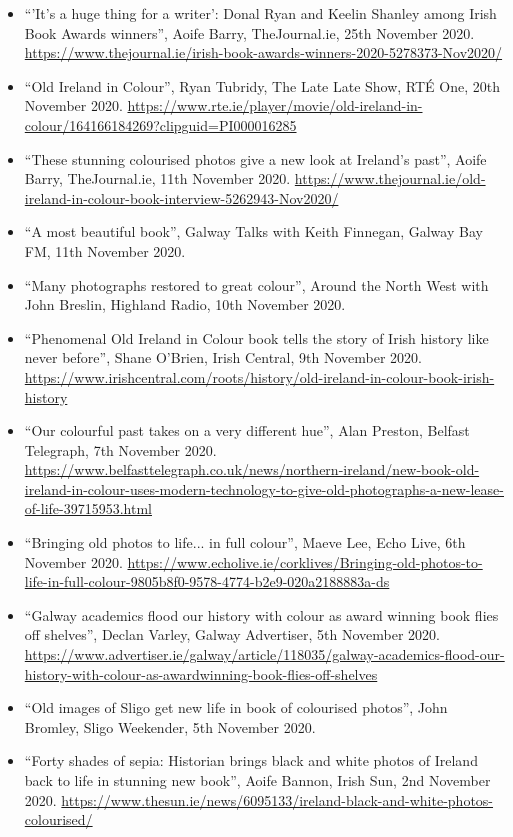 \documentclass[10pt,a4paper]{res} %
\begin{document}
\begin{resume}
{\begin{itemize}
\item ``'It's a huge thing for a writer': Donal Ryan and Keelin Shanley among Irish Book Awards winners'', Aoife Barry, TheJournal.ie, 25th November 2020. \url{https://www.thejournal.ie/irish-book-awards-winners-2020-5278373-Nov2020/}
\item ``Old Ireland in Colour'', Ryan Tubridy, The Late Late Show, RT\'{E} One, 20th November 2020. \url{https://www.rte.ie/player/movie/old-ireland-in-colour/164166184269?clipguid=PI000016285}
\item ``These stunning colourised photos give a new look at Ireland's past'', Aoife Barry, TheJournal.ie, 11th November 2020. \url{https://www.thejournal.ie/old-ireland-in-colour-book-interview-5262943-Nov2020/}
\item ``A most beautiful book'', Galway Talks with Keith Finnegan, Galway Bay FM, 11th November 2020.
\item ``Many photographs restored to great colour'', Around the North West with John Breslin, Highland Radio, 10th November 2020.
\item ``Phenomenal Old Ireland in Colour book tells the story of Irish history like never before'', Shane O'Brien, Irish Central, 9th November 2020. \url{https://www.irishcentral.com/roots/history/old-ireland-in-colour-book-irish-history}
\item ``Our colourful past takes on a very different hue'', Alan Preston, Belfast Telegraph, 7th November 2020. \url{https://www.belfasttelegraph.co.uk/news/northern-ireland/new-book-old-ireland-in-colour-uses-modern-technology-to-give-old-photographs-a-new-lease-of-life-39715953.html}
\item ``Bringing old photos to life... in full colour'', Maeve Lee, Echo Live, 6th November 2020. \url{https://www.echolive.ie/corklives/Bringing-old-photos-to-life-in-full-colour-9805b8f0-9578-4774-b2e9-020a2188883a-ds}
\item ``Galway academics flood our history with colour as award winning book flies off shelves'', Declan Varley, Galway Advertiser, 5th November 2020. \url{https://www.advertiser.ie/galway/article/118035/galway-academics-flood-our-history-with-colour-as-awardwinning-book-flies-off-shelves}
\item ``Old images of Sligo get new life in book of colourised photos'', John Bromley, Sligo Weekender, 5th November 2020.
\item ``Forty shades of sepia: Historian brings black and white photos of Ireland back to life in stunning new book'', Aoife Bannon, Irish Sun, 2nd November 2020. \url{https://www.thesun.ie/news/6095133/ireland-black-and-white-photos-colourised/}

\end{itemize}}
\end{resume}
\end{document}
